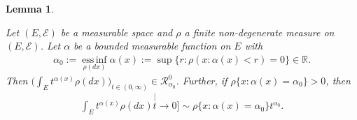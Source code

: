\documentclass[12pt,a4paper]{amsart}
\newtheorem{lem}[thm]{Lemma}
\theoremstyle{definition}
\numberwithin{equation}{section}
\begin{document}
\begin{lem}\label{lem:regularly_variation_and_integration}

  Let $(E, \mathscr E)$ be a measurable space and $\rho$ a finite non-degenerate measure on $(E, \mathscr E)$.
  Let $\alpha$ be a bounded measurable function on $E$ with 
  \begin{align}
    \alpha_0
    := \operatorname*{ess\,inf}_{\rho(dx)} \alpha(x)
    := \sup\{r:\rho(x:\alpha(x) < r) = 0\} \in \mathbb R.
  \end{align}
	Then $\big(\int_E t^{\alpha(x)} \rho(dx)\big)_{t\in (0,\infty)} \in \mathcal R^0_{\alpha_0}$.
	Further, if $\rho \{x:\alpha(x) = \alpha_0\}>0$, then
\begin{align}
	\int_E t^{\alpha(x)} \rho(dx)
	\stackrel[t\to 0]{}{\sim}  \rho\{x:\alpha(x) = \alpha_0\} t^{\alpha_0}.
\end{align}
\end{lem}
\end{document}
